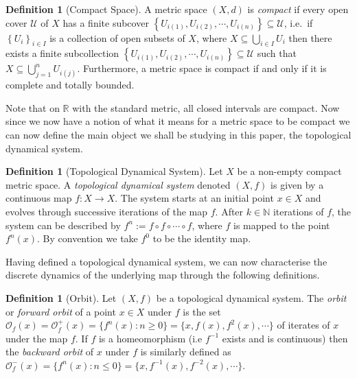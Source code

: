 \documentclass[11pt,a4paper,oneside]{memoir}
\theoremstyle{plain}
\theoremstyle{definition}
\newtheorem{defn}[thm]{Definition}
\begin{document}
\begin{defn}[Compact  Space] \label{defn:compact}
    A metric space $(X, d)$ is \emph{compact} if every open cover $\mathcal{U}$ of $X$ has a finite subcover $\left\lbrace U_{i(1)}, U_{i(2)}, \cdots, U_{i(n)} \right\rbrace \subseteq \mathcal{U}$, i.e.\ if $\left\lbrace U_i \right\rbrace_{i\in I}$ is a collection of open subsets of $X$, where $X \subseteq \bigcup_{i \in I}U_i$ then there exists a finite subcollection $\left\lbrace U_{i(1)}, U_{i(2)}, \cdots, U_{i(n)} \right\rbrace \subseteq \mathcal{U}$ such that $X \subseteq \bigcup_{j = 1}^{n}U_{i(j)}$. Furthermore, a metric space is compact if and only if it is complete and totally bounded.
\end{defn}

Note that on $\mathbb{R}$ with the standard metric, all closed intervals are compact. Now since we now have a notion of what it means for a metric space to be compact we can now define the main object we shall be studying in this paper, the topological dynamical system.

\begin{defn}[Topological Dynamical System] \label{defn:topological-dynamical-system}
    Let $X$ be a non-empty compact metric space. A \emph{topological dynamical system} denoted $(X, f)$ is given by a continuous map $f: X \to X$. The system starts at an initial point $x \in X$ and evolves through successive iterations of the map $f$. After $k \in \mathbb{N}$ iterations of $f$, the system can be described by $f^n := f \circ f \circ \cdots \circ f$, where $f$ is mapped to the point $f^n(x)$. By convention we take $f^0$ to be the identity map.
\end{defn}

Having defined a topological dynamical system, we can now characterise the discrete dynamics of the underlying map through the following definitions.

\begin{defn}[Orbit] \label{defn:orbit}
    Let $(X, f)$ be a topological dynamical system. The \emph{orbit} or \emph{forward orbit} of a point $x \in X$ under $f$ is the set $\mathcal{O}_f(x) = \mathcal{O}^+_f(x) = \lbrace f^n(x) : n \geq 0 \rbrace = \lbrace x, f(x), f^2(x), \cdots \rbrace$ of iterates of $x$ under the map $f$. If $f$ is a homeomorphism (i.e $f^{-1}$ exists and is continuous) then the \emph{backward orbit} of $x$ under $f$ is similarly defined as $\mathcal{O}^-_f(x) = \lbrace f^n(x) : n \leq 0 \rbrace = \lbrace x, f^{-1}(x), f^{-2}(x), \cdots \rbrace$.
\end{defn}
\end{document}
